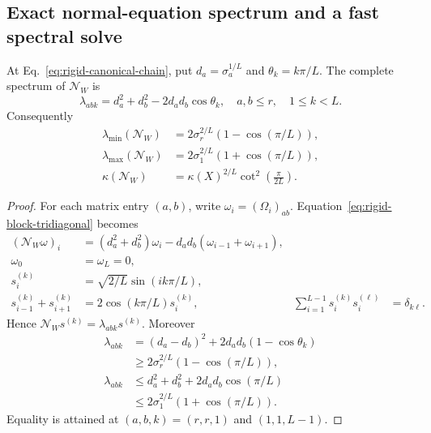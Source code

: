 \subsection{Exact normal-equation spectrum and a fast spectral solve}
\begin{theorem}
\label{thm:joint-spectrum}
At Eq.~\eqref{eq:rigid-canonical-chain}, put
$d_a=\sigma_a^{1/L}$ and $\theta_k=k\pi/L$.
The complete spectrum of $\mathcal N_W$ is
\begin{equation}
\lambda_{abk}=d_a^2+d_b^2-2d_ad_b\cos\theta_k,
\quad a,b\leq r,\quad1\leq k<L.
\label{eq:rigid-chain-eigenvalues}
\end{equation}
Consequently
\begin{align}
\lambda_{\min}(\mathcal N_W)
&=2\sigma_r^{2/L}(1-\cos(\pi/L)),\\
\lambda_{\max}(\mathcal N_W)
&=2\sigma_1^{2/L}(1+\cos(\pi/L)),\\
\kappa(\mathcal N_W)
&=\kappa(X)^{2/L}\cot^2\!\left(\frac{\pi}{2L}\right).
\label{eq:rigid-chain-condition}
\end{align}
\end{theorem}
\begin{proof}
For each matrix entry $(a,b)$, write
$\omega_i=(\Omega_i)_{ab}$. Equation~\eqref{eq:rigid-block-tridiagonal} becomes
\begin{align}
(\mathcal N_W\omega)_i
&=(d_a^2+d_b^2)\omega_i-d_ad_b(\omega_{i-1}+\omega_{i+1}),\\
\omega_0&=\omega_L=0,\\
s_i^{(k)}&=\sqrt{2/L}\sin(ik\pi/L),\\
s_{i-1}^{(k)}+s_{i+1}^{(k)}
&=2\cos(k\pi/L)s_i^{(k)},&
\sum_{i=1}^{L-1}s_i^{(k)}s_i^{(\ell)}&=\delta_{k\ell}.
\end{align}
Hence $\mathcal N_Ws^{(k)}=\lambda_{abk}s^{(k)}$.
Moreover
\begin{align}
\lambda_{abk}
&=(d_a-d_b)^2+2d_ad_b(1-\cos\theta_k)\\
&\geq2\sigma_r^{2/L}(1-\cos(\pi/L)),\\
\lambda_{abk}
&\leq d_a^2+d_b^2+2d_ad_b\cos(\pi/L)\\
&\leq2\sigma_1^{2/L}(1+\cos(\pi/L)).
\end{align}
Equality is attained at $(a,b,k)=(r,r,1)$ and $(1,1,L-1)$.
\end{proof}

